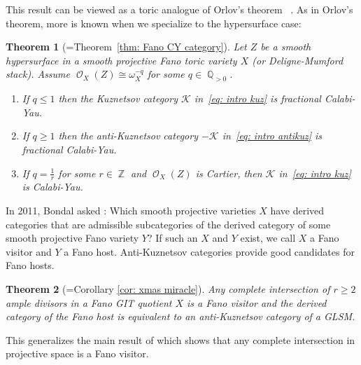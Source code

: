 \documentclass[reqno, 12pt]{amsart}
\newtheorem{theorem}{Theorem}[section]
\theoremstyle{definition}
\newcommand{\op}[1]{\operatorname{#1}}
\newcommand{\newterm}{\textsf}
\newcommand{\dbcoh}[1]{\operatorname{D}^{\operatorname{b}}(\operatorname{coh }#1)}
\def\Z{\op{\mathbb{Z}}}
\def\Q{\op{\mathbb{Q}}}
\def\O{\op{\mathcal{O}}}
\numberwithin{equation}{section}
\begin{document}

This result can be viewed as a toric analogue of Orlov's theorem ~\cite[Theorem 3.11]{Orlov}. As in Orlov's theorem, more is known when we specialize to the hypersurface case:

\begin{theorem}[=Theorem~\ref{thm: Fano CY category}]
Let $Z$ be a smooth hypersurface in a smooth projective Fano toric variety $X$ (or Deligne-Mumford stack). Assume $\O_X(Z) \cong \omega_X^{-q}$ for some $q\in \Q_{>0}$.  
\begin{enumerate}
\item If $q\leq 1$ then the Kuznetsov category $\mathcal K$ in~\eqref{eq: intro kuz} is fractional  Calabi-Yau. 
\item If $q\geq 1$ then the anti-Kuznetsov category $-\mathcal K$ in~\eqref{eq: intro antikuz} is fractional Calabi-Yau.  
\item If $q = \frac{1}{r}$ for some $r \in \Z$ and $\O_X(Z)$ is Cartier, then $\mathcal K$ in~\eqref{eq: intro kuz} is Calabi-Yau. 
\end{enumerate}
\end{theorem}

In 2011, Bondal asked \cite{BBF}: Which smooth projective varieties $X$ have derived categories that are admissible subcategories of the derived category of some smooth projective Fano variety $Y$? If such an $X$ and $Y$ exist, we call $X$ a \newterm{Fano visitor} and $Y$ a \newterm{Fano host}. Anti-Kuznetsov categories provide good candidates for Fano hosts. 
\begin{theorem}[=Corollary \ref{cor: xmas miracle}]
Any complete intersection of $r\ge 2$ ample divisors in a Fano GIT quotient $X$ is a Fano visitor and the derived category of the Fano host is equivalent to an anti-Kuznetsov category of a GLSM.
\end{theorem}
\noindent This generalizes the main result of \cite{KKLL} which shows that any complete intersection in projective space is a Fano visitor.  %
\end{document}
